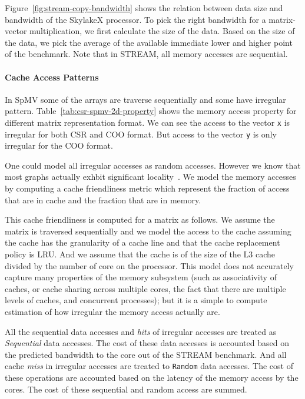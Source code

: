 \documentclass[sigconf,review,anonymous]{acmart}
\begin{document}
Figure~\ref{fig:stream-copy-bandwidth} shows the relation between data
size and bandwidth of the SkylakeX processor. To pick the right
bandwidth for a matrix-vector multiplication, we first calculate the
size of the data. Based on the size of the data, we pick the average
of the available immediate lower and higher point of the
benchmark. Note that in STREAM, all memory accesses are sequential.
 
\paragraph{Cache Access Patterns}
In SpMV some of the arrays are traverse sequentially and some have irregular
pattern. Table~\ref{tab:csr-spmv-2d-property} shows the memory access
property for different matrix representation format. We can see the
access to the vector \texttt{x} is irregular for both CSR and COO
format. But access to the vector \texttt{y} is only irregular for the
COO format.

One could model all irregular accesses as random accesses. However we
know that most graphs actually exhbit significant
locality~\cite{Beamer15}. We model the memory accesses by computing a
cache friendliness metric which represent the fraction of access that
are in cache and the fraction that are in memory.

This cache friendliness is computed for a matrix as follows. We assume
the matrix is traversed sequentially and we model the access to the
cache assuming the cache has the granularity of a cache line and that
the cache replacement policy is LRU. And we assume that the cache is
of the size of the L3 cache divided by the number of core on the
processor. This model does not accurately capture many properties of
the memory subsystem (such as associativity of caches, or cache
sharing across multiple cores, the fact that there are multiple levels
of caches, and concurrent processes); but it is a simple to compute
estimation of how irregular the memory access actually are.

All the sequential data accesses and \textit{hits} of irregular
accesses are treated as \textit{Sequential} data accesses. The cost of
these data accesses is accounted based on the predicted bandwidth to
the core out of the STREAM benchmark. And all cache \textit{miss} in
irregular accesses are treated to \texttt{Random} data accesses. The
cost of these operations are accounted based on the latency of the
memory access by the cores. The cost of these sequential and random
access are summed.
\end{document}
